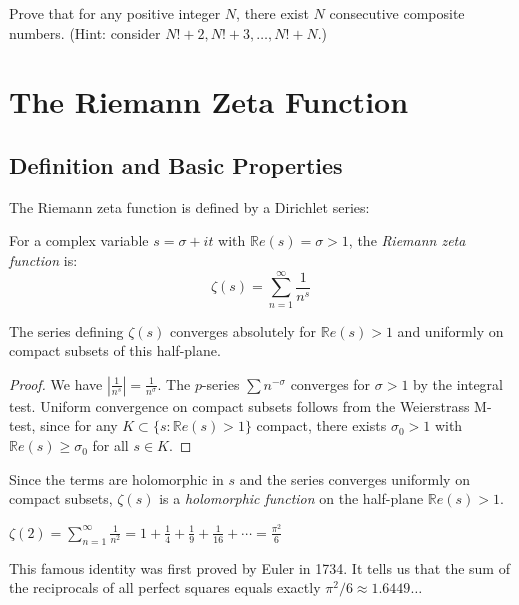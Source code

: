 \begin{exercise}
\label{ex:primegaps}
Prove that for any positive integer $N$, there exist $N$ consecutive composite numbers. (Hint: consider $N! + 2, N! + 3, \ldots, N! + N$.)
\end{exercise}

\section{The Riemann Zeta Function}
\label{sec:zeta}

\subsection{Definition and Basic Properties}

The Riemann zeta function is defined by a Dirichlet series:

\begin{definition}
For a complex variable $s = \sigma + it$ with $\mathbb{R}e(s) = \sigma > 1$, the \textit{Riemann zeta function} is:
\[
\zeta(s) = \sum_{n=1}^{\infty} \frac{1}{n^s}
\]
\end{definition}

\begin{proposition}
\label{prop:zeta_conv}
The series defining $\zeta(s)$ converges absolutely for $\mathbb{R}e(s) > 1$ and uniformly on compact subsets of this half-plane.
\end{proposition}

\begin{proof}
We have $\left|\frac{1}{n^s}\right| = \frac{1}{n^{\sigma}}$. The $p$-series $\sum n^{-\sigma}$ converges for $\sigma > 1$ by the integral test. Uniform convergence on compact subsets follows from the Weierstrass M-test, since for any $K \subset \{s : \mathbb{R}e(s) > 1\}$ compact, there exists $\sigma_0 > 1$ with $\mathbb{R}e(s) \ge \sigma_0$ for all $s \in K$.
\end{proof}

Since the terms are holomorphic in $s$ and the series converges uniformly on compact subsets, $\zeta(s)$ is a \textit{holomorphic function} on the half-plane $\mathbb{R}e(s) > 1$.

\begin{example}
$\zeta(2) = \sum_{n=1}^{\infty} \frac{1}{n^2} = 1 + \frac{1}{4} + \frac{1}{9} + \frac{1}{16} + \cdots = \frac{\pi^2}{6}$

This famous identity was first proved by Euler in 1734. It tells us that the sum of the reciprocals of all perfect squares equals exactly $\pi^2 / 6 \approx 1.6449\ldots$
\end{example}

